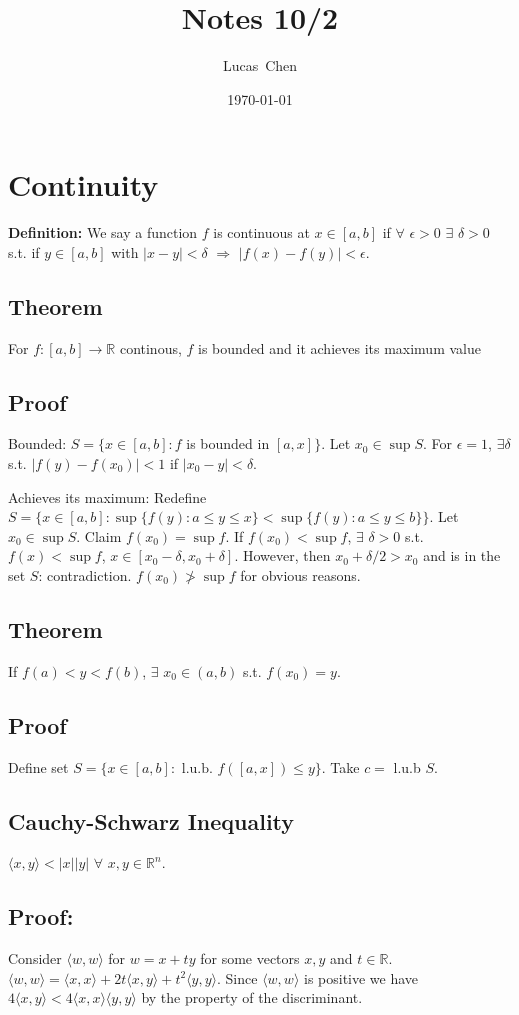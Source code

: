 \documentclass{amsart}
\title{Notes 10/2}
\author{Lucas\ Chen}
\date{\today}
\begin{document}
\maketitle

\section{Continuity}

\textbf{Definition:} We say a function $f$ is continuous at $x\in[a, b]$ if $\forall$ $\epsilon>0$ $\exists$ $\delta>0$ s.t. if
$y\in[a,b]$ with $|x-y|<\delta$ $\Rightarrow$ $|f(x)-f(y)|<\epsilon$.


\subsection*{Theorem} For $f: [a,b]\rightarrow \mathbb{R}$ continous, $f$ is bounded and it achieves its maximum value

\subsection*{Proof} Bounded: $S = \{x\in [a,b]: f$ is bounded in $[a, x]\}$. Let $x_0\in\sup S$. For $\epsilon=1$, $\exists \delta$ s.t. 
$|f(y)-f(x_0)|<1$ if $|x_0-y|<\delta$. 

\noindent Achieves its maximum: Redefine $S= \{x\in[a,b]: \sup\{f(y): a\leq y\leq x\}< \sup\{f(y): a\leq y\leq b\}\}$.
Let $x_0\in\sup S$. Claim $f(x_0)=\sup f$. If $f(x_0)<\sup f$, $\exists$ $\delta >0$ s.t. $f(x)<\sup f$, $x\in[x_0-\delta, x_0+\delta]$.
However, then $x_0+\delta/2>x_0$ and is in the set $S$: contradiction. $f(x_0)\ngtr\sup f$ for obvious reasons.

\subsection*{Theorem} If $f(a)<y<f(b)$, $\exists$ $x_0\in (a,b)$ s.t. $f(x_0)=y$. 

\subsection*{Proof} Define set $S = \{x\in[a,b]:\text{ l.u.b. }f([a, x])\leq y\}$. Take $c=$ l.u.b $S$.

\subsection*{Cauchy-Schwarz Inequality} $\langle x, y\rangle<|x||y|$ $\forall$ $x, y\in\mathbb{R}^n$.

\subsection*{Proof:} Consider $\langle w, w\rangle$ for $w = x+ty$ for some vectors $x,y$ and $t\in\mathbb{R}$. $\langle w, w\rangle=
\langle x,x\rangle + 2t\langle x, y\rangle + t^2\langle y, y\rangle$. Since $\langle w, w\rangle$ is positive we have $4\langle x,y\rangle
<4\langle x,x\rangle \langle y, y\rangle$ by the property of the discriminant.
\end{document}
